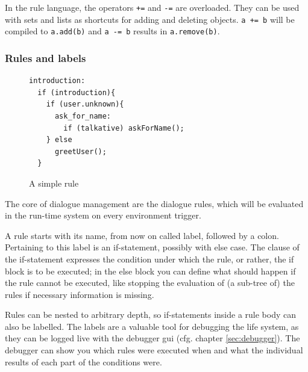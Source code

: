 
In the rule language, the operators \texttt{+=} and \texttt{-=} are overloaded. They can be used with sets and lists as shortcuts for adding and deleting objects. \texttt{a += b} will be compiled to \texttt{a.add(b)} and \texttt{a -= b} results in \texttt{a.remove(b)}.

\subsubsection{Rules and labels}

\begin{figure}
\begin{small}
\begin{lstlisting}
introduction:
  if (introduction){
    if (user.unknown){
      ask_for_name:
        if (talkative) askForName();
    } else
      greetUser();
  }
\end{lstlisting}
\end{small}
\caption{A simple rule}
\end{figure}

%
The core of \vonda dialogue management are the dialogue rules, which will be evaluated in the run-time system on every environment trigger.

A rule starts with its name, from now on called label, followed by a colon. Pertaining to this label is an if-statement, possibly with else case. The clause of the if-statement expresses the condition under which the rule, or rather, the if block is to be executed; in the else block you can define what should happen if the rule cannot be executed, like stopping the evaluation of (a sub-tree of) the rules if necessary information is missing.

%
Rules can be nested to arbitrary depth, so if-statements inside a rule body can also be labelled. The labels are a valuable tool for debugging the life system, as they can be logged live with the debugger gui (cfg. chapter \ref{sec:debugger}). The debugger can show you which rules were executed when and what the individual results of each part of the conditions were.

